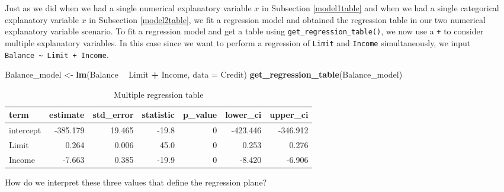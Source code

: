 \documentclass[12pt, krantz2,]{krantz}
\makeatletter
\newenvironment{Shaded}{\begin{snugshade}}{\end{snugshade}}
\newcommand{\DataTypeTok}[1]{\textcolor[rgb]{0.27,0.27,0.27}{#1}}
\newcommand{\KeywordTok}[1]{\textcolor[rgb]{0.27,0.27,0.27}{\textbf{#1}}}
\newcommand{\NormalTok}[1]{#1}
\newcommand{\OperatorTok}[1]{\textcolor[rgb]{0.43,0.43,0.43}{\textbf{#1}}}
\newcommand{\StringTok}[1]{\textcolor[rgb]{0.5,0.5,0.5}{#1}}
\newenvironment{kframe}{%
\medskip{}
\setlength{\fboxsep}{.8em}
 \def\at@end@of@kframe{}%
 \ifinner\ifhmode%
  \def\at@end@of@kframe{\end{minipage}}%
  \begin{minipage}{\columnwidth}%
 \fi\fi%
 \def\FrameCommand##1{\hskip\@totalleftmargin \hskip-\fboxsep
 \colorbox{shadecolor}{##1}\hskip-\fboxsep
     \hskip-\linewidth \hskip-\@totalleftmargin \hskip\columnwidth}%
 \MakeFramed {\advance\hsize-\width
   \@totalleftmargin\z@ \linewidth\hsize
   \@setminipage}}%
 {\par\unskip\endMakeFramed%
 \at@end@of@kframe}
\renewenvironment{Shaded}{\begin{kframe}}{\end{kframe}}
\makeatother
\begin{document}
Just as we did when we had a single numerical explanatory variable \(x\) in Subsection \ref{model1table} and when we had a single categorical explanatory variable \(x\) in Subsection \ref{model2table}, we fit a regression model and obtained the regression table in our two numerical explanatory variable scenario. To fit a regression model and get a table using \texttt{get\_regression\_table()}, we now use a \texttt{+} to consider multiple explanatory variables. In this case since we want to perform a regression of \texttt{Limit} and \texttt{Income} simultaneously, we input \texttt{Balance\ \textasciitilde{}\ Limit\ +\ Income}.

\begin{Shaded}
\begin{Highlighting}[]
\NormalTok{Balance_model <-}\StringTok{ }\KeywordTok{lm}\NormalTok{(Balance }\OperatorTok{~}\StringTok{ }\NormalTok{Limit }\OperatorTok{+}\StringTok{ }\NormalTok{Income, }\DataTypeTok{data =}\NormalTok{ Credit)}
\KeywordTok{get_regression_table}\NormalTok{(Balance_model)}
\end{Highlighting}
\end{Shaded}

\begin{table}[H]

\caption{\label{tab:model3-table-output}Multiple regression table}
\centering
\fontsize{10}{12}\selectfont
\begin{tabular}{lrrrrrr}
\toprule
term & estimate & std\_error & statistic & p\_value & lower\_ci & upper\_ci\\
\midrule
intercept & -385.179 & 19.465 & -19.8 & 0 & -423.446 & -346.912\\
Limit & 0.264 & 0.006 & 45.0 & 0 & 0.253 & 0.276\\
Income & -7.663 & 0.385 & -19.9 & 0 & -8.420 & -6.906\\
\bottomrule
\end{tabular}
\end{table}

How do we interpret these three values that define the regression plane?
\end{document}
